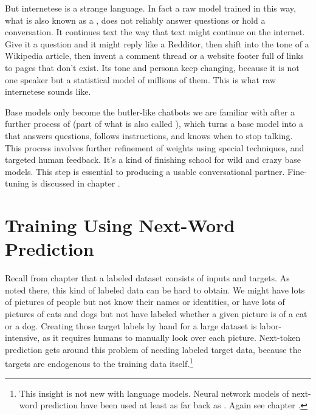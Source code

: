 But internetese is a strange language. In fact a raw model trained in this way, what is also known as a
, does not reliably answer questions or hold a conversation. It
continues text the way that text might continue on the internet. Give it a
question and it might reply like a Redditor, then shift into the tone of a
Wikipedia article, then invent a comment thread or a website footer full of
links to pages that don't exist. Its tone and persona keep changing, because
it is not one speaker but a statistical model of millions of them. This is what
raw internetese sounds like. 

Base models only become the butler-like chatbots we are familiar with after a further process of  (part of what is also called ), which turns a base model into a  that answers
questions, follows instructions, and knows when to stop talking. This process involves further refinement of weights using special techniques, and targeted human feedback. It's a kind of finishing school for wild and crazy base models. This step is
essential to producing a usable conversational
partner. Fine-tuning is discussed in chapter .

\section{Training Using Next-Word Prediction}

Recall from chapter  that a labeled dataset consists of
inputs and targets. As noted there, this kind of labeled data can be hard to
obtain. We might have lots of pictures of people but not know their names or
identities, or have lots of pictures of cats and dogs but not have labeled
whether a given picture is of a cat or a dog. Creating those target labels by
hand for a large dataset is labor-intensive, as it requires humans to manually
look over each picture. Next-token prediction gets around this problem of needing labeled target data, because the 
targets are endogenous to the training data itself.\footnote{This insight is not new with language models. Neural network models of next-word prediction have been used at least as far back as \cite{elman1990finding}. Again see chapter . }

